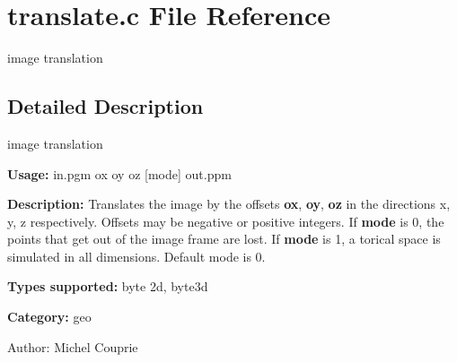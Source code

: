 \section{translate.c File Reference}
\label{translate_8c}
image translation 



\subsection{Detailed Description}
image translation 

{\bf Usage:} in.pgm ox oy oz [mode] out.ppm

{\bf Description:} Translates the image by the offsets {\bf ox}, {\bf oy}, {\bf oz} in the directions x, y, z respectively. Offsets may be negative or positive integers. If {\bf mode} is 0, the points that get out of the image frame are lost. If {\bf mode} is 1, a torical space is simulated in all dimensions. Default mode is 0.

{\bf Types supported:} byte 2d, byte3d

{\bf Category:} geo

\begin{Desc}
\item[Author:]Michel Couprie \end{Desc}
